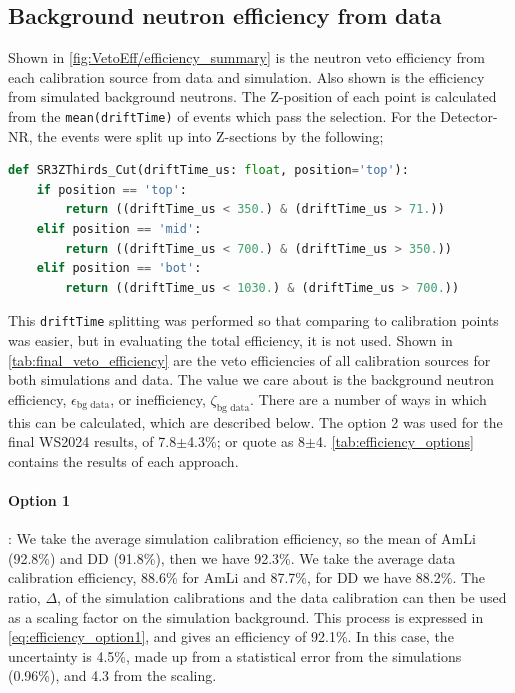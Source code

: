 \subsection{Background neutron efficiency from data}
Shown in \autoref{fig:VetoEff/efficiency_summary} is the neutron veto efficiency from each calibration source from data and simulation.
Also shown is the efficiency from simulated background neutrons.
The Z-position of each point is calculated from the \lstinline{mean(driftTime)} of events which pass the selection.
For the Detector-NR, the events were split up into Z-sections by the following;
\begin{lstlisting}[backgroundcolor = \color{lightgray},language = Python]
def SR3ZThirds_Cut(driftTime_us: float, position='top'):
    if position == 'top':
        return ((driftTime_us < 350.) & (driftTime_us > 71.))
    elif position == 'mid':
        return ((driftTime_us < 700.) & (driftTime_us > 350.))
    elif position == 'bot':
        return ((driftTime_us < 1030.) & (driftTime_us > 700.))
\end{lstlisting}
This \lstinline{driftTime} splitting was performed so that comparing to calibration points was easier, but in evaluating the total efficiency, it is not used.
Shown in \autoref{tab:final_veto_efficiency} are the veto efficiencies of all calibration sources for both simulations and data.
The value we care about is the background neutron efficiency, $\epsilon_{\textrm{bg data}}$, or inefficiency, $\zeta_{\textrm{bg data}}$.
There are a number of ways in which this can be calculated, which are described below.
The option 2 was used for the final WS2024 results, of 7.8$\pm$4.3\%; or quote as 8$\pm$4.
\autoref{tab:efficiency_options} contains the results of each approach.
\paragraph{Option 1}:
We take the average simulation calibration efficiency, so the mean of AmLi (92.8\%) and DD (91.8\%), then we have 92.3\%.
We take the average data calibration efficiency, 88.6\% for AmLi and 87.7\%, for DD we have 88.2\%.
The ratio, $\Delta$, of the simulation calibrations and the data calibration can then be used as a scaling factor on the simulation background.
This process is expressed in \autoref{eq:efficiency_option1}, and gives an efficiency of 92.1\%.
In this case, the uncertainty is 4.5\%, made up from a statistical error from the simulations (0.96\%), and 4.3 from the scaling.

